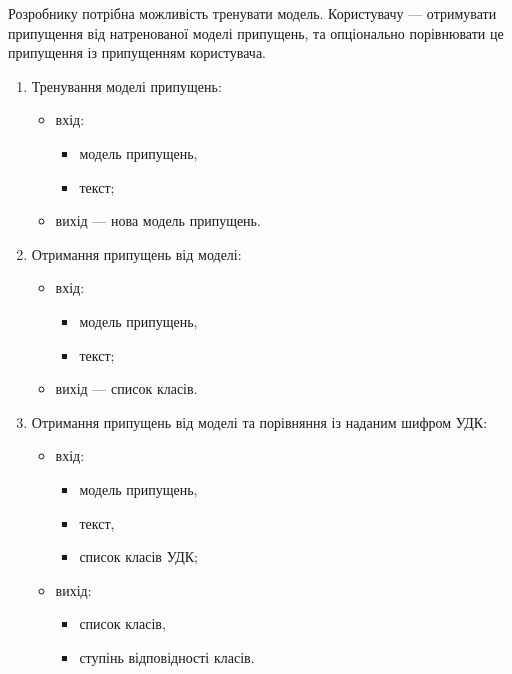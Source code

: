 \documentclass[14pt]{extarticle}
\begin{document}
  Розробнику потрібна можливість тренувати модель.
  Користувачу --- отримувати припущення від натренованої моделі припущень,
  та опціонально порівнювати це припущення із припущенням користувача.
  \begin{enumerate}[labelindent=\dimexpr\parindent*2\relax, leftmargin=*]
    \item Тренування моделі припущень:
      \begin{itemize}[labelindent=\dimexpr\parindent\relax, leftmargin=*]
        \item вхід:
          \begin{itemize}[labelindent=\dimexpr\parindent\relax, leftmargin=*]
            \item модель припущень,
            \item текст;
          \end{itemize}
        \item вихід --- нова модель припущень.
      \end{itemize}
    \item Отримання припущень від моделі:
      \begin{itemize}[labelindent=\dimexpr\parindent\relax, leftmargin=*]
        \item вхід:
          \begin{itemize}[labelindent=\dimexpr\parindent\relax, leftmargin=*]
            \item модель припущень,
            \item текст;
          \end{itemize}
        \item вихід --- список класів.
      \end{itemize}
    \item Отримання припущень від моделі та порівняння із наданим шифром УДК:
      \begin{itemize}[labelindent=\dimexpr\parindent\relax, leftmargin=*]
        \item вхід:
          \begin{itemize}[labelindent=\dimexpr\parindent\relax, leftmargin=*]
            \item модель припущень,
            \item текст,
            \item список класів УДК;
          \end{itemize}
        \item вихід:
          \begin{itemize}[labelindent=\dimexpr\parindent\relax, leftmargin=*]
            \item список класів,
            \item ступінь відповідності класів.
          \end{itemize}
      \end{itemize}
  \end{enumerate}
\end{document}
